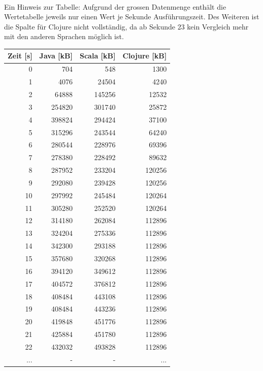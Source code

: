 \documentclass{fancydocument}
\begin{document}
\\
\bigskip
\noindent
Ein Hinweis zur Tabelle: Aufgrund der grossen Datenmenge enthält die Wertetabelle jeweils nur einen Wert je Sekunde Ausführungszeit. Des Weiteren ist die Spalte für Clojure nicht vollständig, da ab Sekunde 23 kein Vergleich mehr mit den anderen Sprachen möglich ist.


\begin{center}
\begin{tabular}{|r|r|r|r|} \hline
\textbf{Zeit [s]} & \textbf{Java [kB]} & \textbf{Scala [kB]} & \textbf{Clojure [kB]}\\
\hline
0 & 704 & 548 & 1300\\
\hline
1 & 4076 & 24504 & 4240\\
\hline
2 & 64888 & 145256 & 12532\\
\hline
3 & 254820 & 301740 & 25872\\
\hline
4 & 398824 & 294424 & 37100\\
\hline
5 & 315296 & 243544 & 64240\\
\hline
6 & 280544 & 228976 & 69396\\
\hline
7 & 278380 & 228492 & 89632\\
\hline
8 & 287952 & 233204 & 120256\\
\hline
9 & 292080 & 239428 & 120256\\
\hline
10 & 297992 & 245484 & 120264\\
\hline
11 & 305280 & 252520 & 120264\\
\hline
12 & 314180 & 262084 & 112896\\
\hline
13 & 324204 & 275336 & 112896\\
\hline
14 & 342300 & 293188 & 112896\\
\hline
15 & 357680 & 320268 & 112896\\
\hline
16 & 394120 & 349612 & 112896\\
\hline
17 & 404572 & 376812 & 112896\\
\hline
18 & 408484 & 443108 & 112896\\
\hline
19 & 408484 & 443236 & 112896\\
\hline
20 & 419848 & 451776 & 112896\\
\hline
21 & 425884 & 451780 & 112896\\
\hline
22 & 432032 & 493828 & 112896\\
\hline
... & - & - & ...\\
\hline
\end{tabular}


\end{center}
\end{document}
